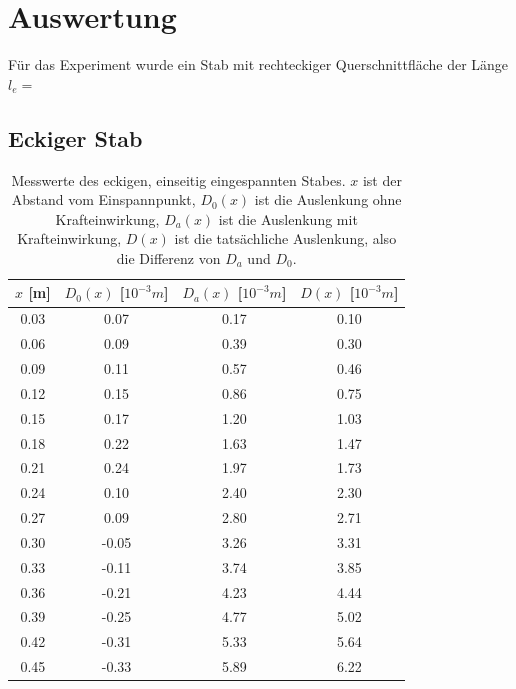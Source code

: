 \documentclass[titlepage = firstcover]{scrartcl}
\begin{document}
    \newpage
    \section{Auswertung}
      Für das Experiment wurde ein Stab mit rechteckiger Querschnittfläche der Länge $l_e = $
      \subsection{Eckiger Stab}
        \begin{table}[h]
          \centering
          \caption{Messwerte des eckigen, einseitig eingespannten Stabes.
                   $x$ ist der Abstand vom Einspannpunkt,
                   $D_0(x)$ ist die Auslenkung ohne Krafteinwirkung,
                   $D_a(x)$ ist die Auslenkung mit Krafteinwirkung,
                   $D(x)$ ist die tatsächliche Auslenkung, also die Differenz von $D_a$ und $D_0$.}
          \label{tab:tabEeins}
          \begin{tabular}{c c c c}
            \toprule
            {$x$ [m]} & {$D_0(x)$ [$10^{-3}m$]} & {$D_a(x)$ [$10^{-3}m$]} & {$D(x)$ [$10^{-3}m$]}\\
            \midrule
            0.03 & 0.07 & 0.17 & 0.10\\
            0.06 & 0.09 & 0.39 & 0.30\\
            0.09 & 0.11 & 0.57 & 0.46\\
            0.12 & 0.15 & 0.86 & 0.75\\
            0.15 & 0.17 & 1.20 & 1.03\\
            0.18 & 0.22 & 1.63 & 1.47\\
            0.21 & 0.24 & 1.97 & 1.73\\
            0.24 & 0.10 & 2.40 & 2.30\\
            0.27 & 0.09 & 2.80 & 2.71\\
            0.30 &-0.05 & 3.26 & 3.31\\
            0.33 &-0.11 & 3.74 & 3.85\\
            0.36 &-0.21 & 4.23 & 4.44\\
            0.39 &-0.25 & 4.77 & 5.02\\
            0.42 &-0.31 & 5.33 & 5.64\\
            0.45 &-0.33 & 5.89 & 6.22\\
            \bottomrule            
          \end{tabular}
        \end{table}
\end{document}
